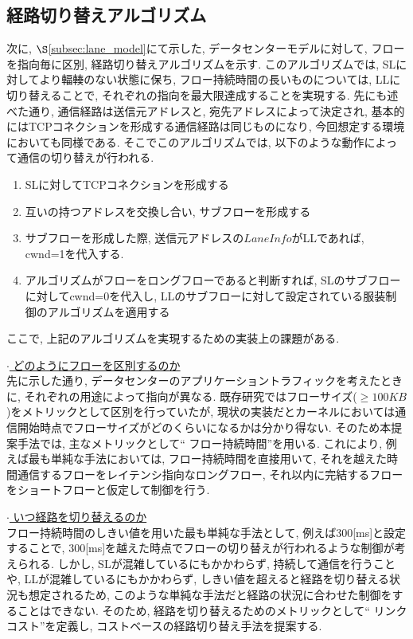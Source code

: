 \subsection{経路切り替えアルゴリズム}
次に, $\S$\ref{subsec:lane_model}にて示した, データセンターモデルに対して, フローを指向毎に区別,
経路切り替えアルゴリズムを示す.
このアルゴリズムでは, SLに対してより輻輳のない状態に保ち, フロー持続時間の長いものについては, LLに切り替えることで,
それぞれの指向を最大限達成することを実現する. 
先にも述べた通り, 通信経路は送信元アドレスと, 宛先アドレスによって決定され, 基本的にはTCPコネクションを形成する通信経路は同じものになり,
今回想定する環境においても同様である. 
そこでこのアルゴリズムでは, 以下のような動作によって通信の切り替えが行われる. 
\begin{enumerate}
\item SLに対してTCPコネクションを形成する
\item 互いの持つアドレスを交換し合い, サブフローを形成する
\item サブフローを形成した際, 送信元アドレスの$Lane Info$がLLであれば, cwnd=1を代入する. 
\item アルゴリズムがフローをロングフローであると判断すれば,  SLのサブフローに対してcwnd=0を代入し,
LLのサブフローに対して設定されている服装制御のアルゴリズムを適用する
\end{enumerate} 
ここで, 上記のアルゴリズムを実現するための実装上の課題がある. 

\underline{$\cdot$ どのようにフローを区別するのか} \\
先に示した通り, データセンターのアプリケーショントラフィックを考えたときに, それぞれの用途によって指向が異なる. 
既存研究ではフローサイズ($\geq 100KB$)をメトリックとして区別を行っていたが,
現状の実装だとカーネルにおいては通信開始時点でフローサイズがどのくらいになるかは分かり得ない. 
そのため本提案手法では, 主なメトリックとして`` フロー持続時間''を用いる.
これにより, 例えば最も単純な手法においては, フロー持続時間を直接用いて, それを越えた時間通信するフローをレイテンシ指向なロングフロー,
それ以内に完結するフローをショートフローと仮定して制御を行う. 

\underline{$\cdot$ いつ経路を切り替えるのか} \\
フロー持続時間のしきい値を用いた最も単純な手法として, 例えば300[ms]と設定することで,
300[ms]を越えた時点でフローの切り替えが行われるような制御が考えられる. 
しかし, SLが混雑しているにもかかわらず, 持続して通信を行うことや, LLが混雑しているにもかかわらず,
しきい値を超えると経路を切り替える状況も想定されるため, このような単純な手法だと経路の状況に合わせた制御をすることはできない. 
そのため, 経路を切り替えるためのメトリックとして`` リンクコスト''を定義し, コストベースの経路切り替え手法を提案する. 

